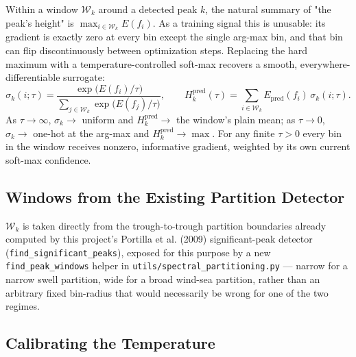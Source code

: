 \documentclass[11pt,a4paper]{article}
\begin{document}
Within a window $\mathcal{W}_k$ around a detected peak $k$, the natural
summary of "the peak's height" is $\max_{i\in\mathcal{W}_k} E(f_i)$. As a
training signal this is unusable: its gradient is exactly zero at every bin
except the single arg-max bin, and that bin can flip discontinuously between
optimization steps. Replacing the hard maximum with a temperature-controlled
soft-max recovers a smooth, everywhere-differentiable surrogate:
\begin{equation}
\sigma_k(i;\tau) = \frac{\exp\big(E(f_i)/\tau\big)}
{\sum_{j\in\mathcal{W}_k}\exp\big(E(f_j)/\tau\big)}, \qquad
H_k^{\text{pred}}(\tau) = \sum_{i\in\mathcal{W}_k} E_{\text{pred}}(f_i)\,\sigma_k(i;\tau).
\end{equation}
As $\tau\to\infty$, $\sigma_k\to$ uniform and $H_k^{\text{pred}}\to$ the
window's plain mean; as $\tau\to0$, $\sigma_k\to$ one-hot at the arg-max and
$H_k^{\text{pred}}\to\max$. For any finite $\tau>0$ every bin in the window
receives nonzero, informative gradient, weighted by its own current
soft-max confidence.

\subsection{Windows from the Existing Partition Detector}

$\mathcal{W}_k$ is taken directly from the trough-to-trough partition
boundaries already computed by this project's Portilla et al. (2009)
significant-peak detector (\texttt{find\_significant\_peaks}), exposed for
this purpose by a new \texttt{find\_peak\_windows} helper in
\texttt{utils/spectral\_partitioning.py} — narrow for a narrow swell
partition, wide for a broad wind-sea partition, rather than an arbitrary
fixed bin-radius that would necessarily be wrong for one of the two regimes.

\subsection{Calibrating the Temperature}
\end{document}
